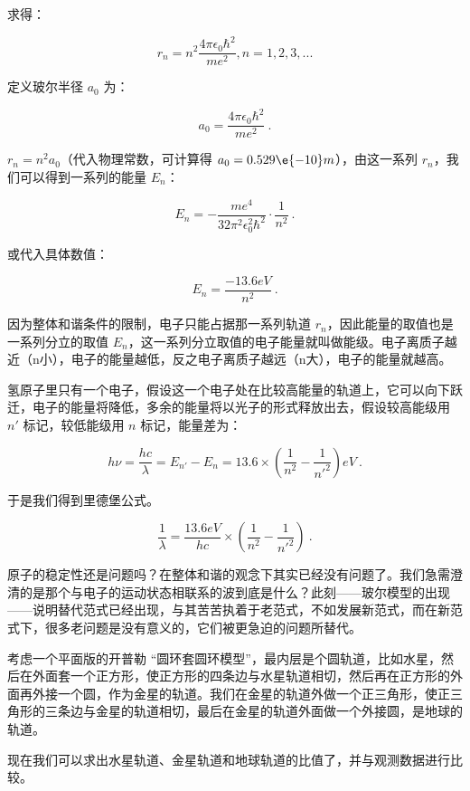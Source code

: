求得：

\begin{equation}
r_n = n^2 \frac{4 \pi \epsilon_0 \hbar^2  }{ m e^2}, n = 1, 2, 3, ...
\end{equation}

定义玻尔半径 $a_0$ 为：

\begin{equation}
a_0 = \frac{4 \pi \epsilon_0 \hbar^2  }{ m e^2}~.
\end{equation}

$r_n = n^2 a_0$（代入物理常数，可计算得 $a_0 = 0.529\e{-10} m$），由这一系列 $r_n$，我们可以得到一系列的能量 $E_n$：

\begin{equation}
E_n = - \frac{m e^4 }{ 32 \pi^2 \epsilon_0^2 \hbar^2 } \cdot {\frac{1}{n^2}}~.
\end{equation}

或代入具体数值：

\begin{equation}
E_n = \frac{-13.6 eV}{n^2}~.
\end{equation}

因为整体和谐条件的限制，电子只能占据那一系列轨道 $r_n$，因此能量的取值也是一系列分立的取值 $E_n$，这一系列分立取值的电子能量就叫做能级。电子离质子越近（n小），电子的能量越低，反之电子离质子越远（n大），电子的能量就越高。

氢原子里只有一个电子，假设这一个电子处在比较高能量的轨道上，它可以向下跃迁，电子的能量将降低，多余的能量将以光子的形式释放出去，假设较高能级用 $n'$ 标记，较低能级用 $n$ 标记，能量差为：

\begin{equation}
h \nu = \frac{hc}{\lambda} = E_{n'} - E_n = 13.6 \times \left( \frac{1}{n^2}  - \frac{1}{n'^2} \right) eV ~.
\end{equation}

于是我们得到里德堡公式。

\begin{equation}
\frac{1}{\lambda } = \frac{13.6 eV}{hc} \times \left( \frac{1}{n^2}  - \frac{1}{n'^2} \right)~.
\end{equation}

原子的稳定性还是问题吗？在整体和谐的观念下其实已经没有问题了。我们急需澄清的是那个与电子的运动状态相联系的波到底是什么？此刻——玻尔模型的出现——说明替代范式已经出现，与其苦苦执着于老范式，不如发展新范式，而在新范式下，很多老问题是没有意义的，它们被更急迫的问题所替代。

\begin{exercise}{}
考虑一个平面版的开普勒 “圆环套圆环模型”，最内层是个圆轨道，比如水星，然后在外面套一个正方形，使正方形的四条边与水星轨道相切，然后再在正方形的外面再外接一个圆，作为金星的轨道。我们在金星的轨道外做一个正三角形，使正三角形的三条边与金星的轨道相切，最后在金星的轨道外面做一个外接圆，是地球的轨道。

现在我们可以求出水星轨道、金星轨道和地球轨道的比值了，并与观测数据进行比较。
\end{exercise}

